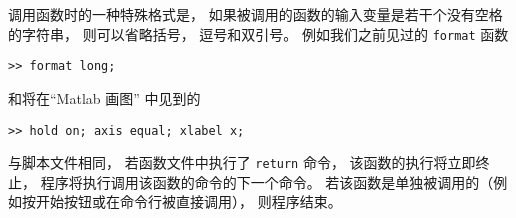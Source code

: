 调用函数时的一种特殊格式是， 如果被调用的函数的输入变量是若干个没有空格的字符串， 则可以省略括号， 逗号和双引号。 例如我们之前见过的 \verb|format| 函数
\begin{lstlisting}[language=matlabC]
>> format long;
\end{lstlisting}
和将在“Matlab 画图” 中见到的
\begin{lstlisting}[language=matlabC]
>> hold on; axis equal; xlabel x;
\end{lstlisting}

与脚本文件相同， 若函数文件中执行了 \verb|return| 命令， 该函数的执行将立即终止， 程序将执行调用该函数的命令的下一个命令。 若该函数是单独被调用的（例如按开始按钮或在命令行被直接调用）， 则程序结束。
